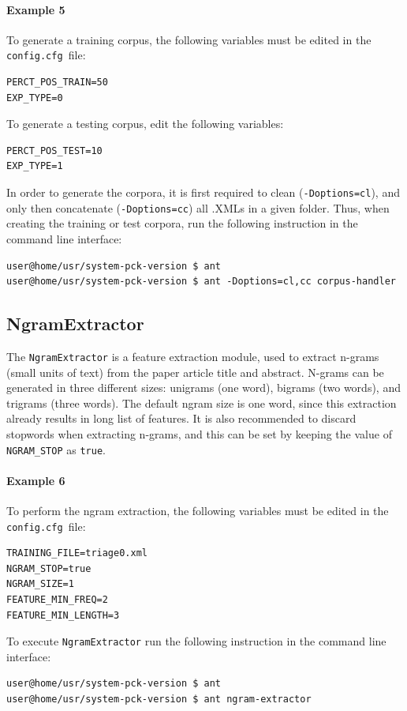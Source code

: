 \documentclass[11pt]{article}
\newcommand{\configfile}{\texttt{config.cfg{ }}}
\begin{document}
\paragraph{Example 5}
To generate a training corpus, the following variables must be edited in the \configfile file:
\begin{lstlisting}
PERCT_POS_TRAIN=50
EXP_TYPE=0
\end{lstlisting}
To generate a testing corpus, edit the following variables:
\begin{lstlisting}
PERCT_POS_TEST=10
EXP_TYPE=1
\end{lstlisting}
In order to generate the corpora, it is first required to clean (\texttt{-Doptions=cl}), 
and only then concatenate (\texttt{-Doptions=cc}) all .XMLs in a given folder.
Thus, when creating the training or test corpora, 
run the following instruction in the command line interface:
\begin{lstlisting}
user@home/usr/system-pck-version $ ant
user@home/usr/system-pck-version $ ant -Doptions=cl,cc corpus-handler
\end{lstlisting}

\subsection{NgramExtractor}
The \texttt{NgramExtractor} is a feature extraction module, used to extract n-grams 
(small units of text) from the paper article title and abstract.
N-grams can be generated in three different sizes: unigrams (one word), bigrams (two words), and trigrams (three words).
The default ngram size is one word, since this extraction already results in long list of features.
It is also recommended to discard stopwords when extracting n-grams, 
and this can be set by keeping the value of \texttt{NGRAM\_STOP} as \texttt{true}.
\paragraph{Example 6}
To perform the ngram extraction, the following variables must be edited in the \configfile file:
\begin{lstlisting}
TRAINING_FILE=triage0.xml
NGRAM_STOP=true
NGRAM_SIZE=1
FEATURE_MIN_FREQ=2
FEATURE_MIN_LENGTH=3
\end{lstlisting}
To execute \texttt{NgramExtractor} run the following instruction in the command line interface:
\begin{lstlisting}
user@home/usr/system-pck-version $ ant
user@home/usr/system-pck-version $ ant ngram-extractor
\end{lstlisting}
\end{document}
